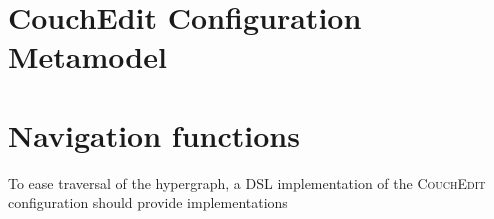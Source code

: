 {}
\chapter{CouchEdit Configuration Metamodel}
\label{app:complete-mm}
%   

   

\vspace*{2.8cm}
\label{fig:complete-metamodel}
\newpage
\vspace*{6cm}
\clearpage
\chapter{Navigation functions}
\label{app:navigationfunctions}

To ease traversal of the hypergraph, a DSL implementation of the \textsc{CouchEdit} configuration should provide implementations

